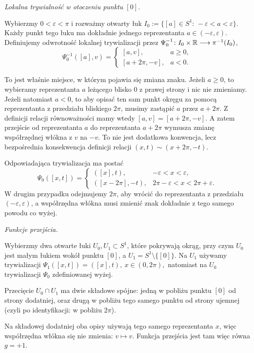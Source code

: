 \begin{przyklad}
\medskip
\emph{Lokalna trywialność w otoczeniu punktu $[0]$.}

Wybierzmy
$
0<\varepsilon<\pi
$
i rozważmy otwarty łuk
$
I_0:=\{[a]\in S^1:\,-\varepsilon<a<\varepsilon\}.
$
Każdy punkt tego łuku ma dokładnie jednego reprezentanta
$
a\in(-\varepsilon,\varepsilon).
$
Definiujemy odwrotność lokalnej trywializacji przez $\Psi_0^{-1}\colon I_0\times\mathbb{R}\longrightarrow \pi^{-1}(I_0)$,
\[
\Psi_0^{-1}([a],v)=
\begin{cases}
[a,v],& a\ge 0,\\[1mm]
[a+2\pi,-v],& a<0.
\end{cases}
\]

To jest właśnie miejsce, w którym pojawia się zmiana znaku.
Jeżeli $a\ge 0$, to wybieramy reprezentanta $a$ leżącego blisko $0$
z prawej strony i nic nie zmieniamy.
Jeżeli natomiast $a<0$, to aby opisać ten sam punkt okręgu za pomocą
reprezentanta z przedziału bliskiego $2\pi$, musimy zastąpić $a$
przez $a+2\pi$. Z definicji relacji równoważności mamy wtedy
$
[a,v]=[a+2\pi,-v].
$
A zatem przejście od reprezentanta $a$ do reprezentanta $a+2\pi$
wymusza zmianę współrzędnej włókna z $v$ na $-v$.
To nie jest dodatkowa konwencja, lecz bezpośrednia konsekwencja definicji
relacji
$
(x,t)\sim(x+2\pi,-t).
$

Odpowiadająca trywializacja ma postać
\[
\Psi_0([x,t])=
\begin{cases}
([x],t),& -\varepsilon<x<\varepsilon,\\[1mm]
([x-2\pi],-t),& 2\pi-\varepsilon<x<2\pi+\varepsilon.
\end{cases}
\]
W drugim przypadku odejmujemy $2\pi$, aby wrócić do reprezentanta
z przedziału $(-\varepsilon,\varepsilon)$, a współrzędna włókna
musi zmienić znak dokładnie z tego samego powodu co wyżej.

\medskip
\emph{Funkcje przejścia.}

Wybierzmy dwa otwarte łuki $U_0,U_1\subset S^1$, które pokrywają okrąg,
przy czym $U_0$ jest małym łukiem wokół punktu $[0]$, a $U_1=S^1\setminus\{[0]\}$.
Na $U_1$ używamy trywializacji
$
\Psi_1([x,t])=([x],t),
\ x\in(0,2\pi),
$
natomiast na $U_0$ trywializacji $\Psi_0$ zdefiniowanej wyżej.

Przecięcie $U_0\cap U_1$ ma dwie składowe spójne:
jedną w pobliżu punktu $[0]$ od strony dodatniej,
oraz drugą w pobliżu tego samego punktu od strony ujemnej
(czyli po identyfikacji: w pobliżu $2\pi$).

Na składowej dodatniej oba opisy używają tego samego reprezentanta $x$,
więc współrzędna włókna się nie zmienia:
$
v\longmapsto v.
$
Funkcja przejścia jest tam więc równa
$
g=+1.
$


\end{przyklad}
